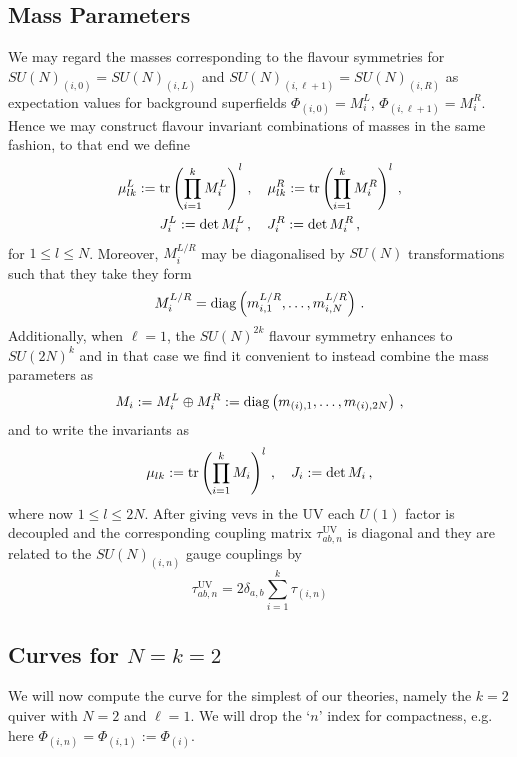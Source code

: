 \documentclass[main.tex]{subfiles}
\begin{document}
\subsection{Mass Parameters}
We may regard the masses corresponding to the flavour symmetries for \newline$SU(N)_{(i,0)}=SU(N)_{(i,L)}$ and $SU(N)_{(i,\ell+1)}=SU(N)_{(i,R)}$ as expectation values for background superfields $\Phi_{(i,0)}=M^L_i$, $\Phi_{(i,\ell+1)}=M^R_i$. Hence we may construct flavour invariant combinations of masses in the same fashion, to that end we define
\begin{gather}
\mu^{L}_{lk}:=\operatorname{tr}\left(\prod_{i=1}^kM_i^L\right)^l\,,\quad \mu^{R}_{lk}:=\operatorname{tr}\left(\prod_{i=1}^kM_i^R\right)^l\,,\\ J^L_i:=\det M_i^L\,,\quad J^R_i:=\det M_i^R\,,
\end{gather}
for $1\leq l\leq N$. Moreover, $M_{i}^{L/R}$ may be diagonalised by $SU(N)$ transformations such that they take they form
\begin{equation}
M_{i}^{L/R}=\operatorname{diag}\left(m_{i,1}^{L/R},\dots,m_{i,N}^{L/R}\right)\,.
\end{equation}
Additionally, when $\ell=1$, the $SU(N)^{2k}$ flavour symmetry enhances to $SU(2N)^k$ and in that case we find it convenient to instead combine the mass parameters as 
\begin{equation}
M_i:=M_i^L\oplus M_i^R :=\operatorname{diag}\left(m_{(i),1},\dots,m_{(i),2N}\right)\,,
\end{equation}
and to write the invariants as 
\begin{equation}\label{eqn:massparam2}
\mu_{lk}:=\operatorname{tr}\left(\prod_{i=1}^kM_i\right)^l\,,\quad J_i:=\det M_i\,,
\end{equation}
where now $1\leq l\leq 2N$. 
After giving vevs in the UV each $U(1)$ factor is decoupled and the corresponding coupling matrix $\tau_{ab,n}^{\text{UV}}$ is diagonal and they are related to the $SU(N)_{(i,n)}$ gauge couplings by
\begin{equation}
\tau_{ab,n}^{\text{UV}}=2\delta_{a,b}\sum_{i=1}^k\tau_{(i,n)}
\end{equation}
\subsection{Curves for \texorpdfstring{$N=k=2$}{N=k=2}}
We will now compute the curve for the simplest of our theories, namely the $k=2$ quiver with $N=2$ and $\ell=1$. We will drop the `$n$' index for compactness, e.g. here $\Phi_{(i,n)}=\Phi_{(i,1)}:=\Phi_{(i)}$. 
\end{document}
